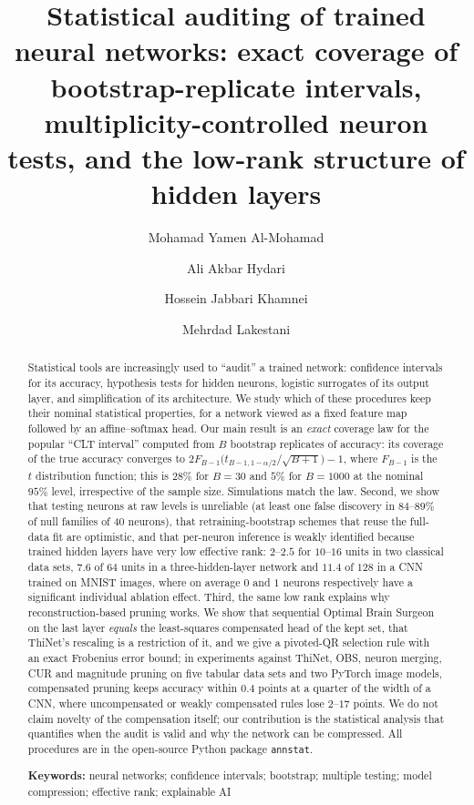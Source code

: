 \documentclass[11pt,a4paper]{article}
\title{\textbf{Statistical auditing of trained neural networks: exact coverage of bootstrap-replicate intervals, multiplicity-controlled neuron tests, and the low-rank structure of hidden layers}}
\author[1]{Mohamad Yamen Al-Mohamad}
\author[1,*]{Ali Akbar Hydari}
\author[1]{Hossein Jabbari Khamnei}
\author[2]{Mehrdad Lakestani}
\affil[1]{Department of Statistics, University of Tabriz, Tabriz, Iran}
\affil[2]{Department of Applied Mathematics, University of Tabriz, Tabriz, Iran}
\affil[*]{Corresponding author: heydari@tabrizu.ac.ir}
\date{}
\theoremstyle{remark}\newtheorem{remark}{Remark}
\begin{document}
\maketitle

\begin{abstract}
\noindent Statistical tools are increasingly used to ``audit'' a trained network: confidence intervals for its accuracy, hypothesis tests for hidden neurons, logistic surrogates of its output layer, and simplification of its architecture. We study which of these procedures keep their nominal statistical properties, for a network viewed as a fixed feature map followed by an affine--softmax head. Our main result is an \emph{exact} coverage law for the popular ``CLT interval'' computed from $B$ bootstrap replicates of accuracy: its coverage of the true accuracy converges to $2F_{B-1}\!\big(t_{B-1,1-\alpha/2}/\sqrt{B+1}\big)-1$, where $F_{B-1}$ is the $t$ distribution function; this is $28\%$ for $B=30$ and $5\%$ for $B=1000$ at the nominal $95\%$ level, irrespective of the sample size. Simulations match the law. Second, we show that testing neurons at raw levels is unreliable (at least one false discovery in $84$--$89\%$ of null families of 40 neurons), that retraining-bootstrap schemes that reuse the full-data fit are optimistic, and that per-neuron inference is weakly identified because trained hidden layers have very low effective rank: $2$--$2.5$ for $10$--$16$ units in two classical data sets, $7.6$ of $64$ units in a three-hidden-layer network and $11.4$ of $128$ in a CNN trained on MNIST images, where on average $0$ and $1$ neurons respectively have a significant individual ablation effect. Third, the same low rank explains why reconstruction-based pruning works. We show that sequential Optimal Brain Surgeon on the last layer \emph{equals} the least-squares compensated head of the kept set, that ThiNet's rescaling is a restriction of it, and we give a pivoted-QR selection rule with an exact Frobenius error bound; in experiments against ThiNet, OBS, neuron merging, CUR and magnitude pruning on five tabular data sets and two PyTorch image models, compensated pruning keeps accuracy within $0.4$ points at a quarter of the width of a CNN, where uncompensated or weakly compensated rules lose $2$--$17$ points. We do not claim novelty of the compensation itself; our contribution is the statistical analysis that quantifies when the audit is valid and why the network can be compressed. All procedures are in the open-source Python package \texttt{annstat}.
\medskip

\noindent\textbf{Keywords:} neural networks; confidence intervals; bootstrap; multiple testing; model compression; effective rank; explainable AI
\end{abstract}
\end{document}
